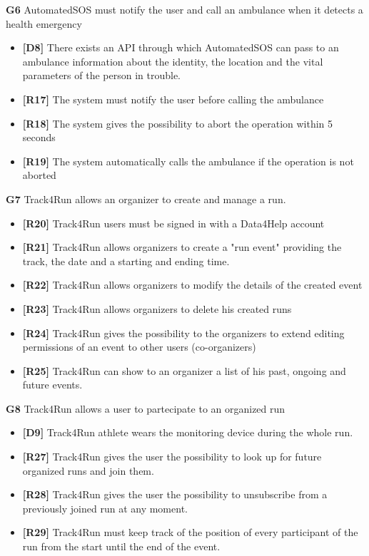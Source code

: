 \item \textbf{G6} AutomatedSOS must notify the user and call an ambulance when it detects a health emergency
\begin{itemize}
\item \textbf{[D8]} There exists an API through which AutomatedSOS can pass to an ambulance information about the identity, the location and the vital parameters of the person in trouble.
\item \textbf{[R17]} The system must notify the user before calling the ambulance
\item \textbf{[R18]} The system gives the possibility to abort the operation within 5 seconds
\item \textbf{[R19]} The system automatically calls the ambulance if the operation is not aborted
\end{itemize}

\item \textbf{G7} Track4Run allows an organizer to create and manage a run.
\begin{itemize}
\item \textbf{[R20]} Track4Run users must be signed in with a Data4Help account
\item \textbf{[R21]} Track4Run allows organizers to create a "run event" providing the track, the date and a starting and ending time.
\item \textbf{[R22]}  Track4Run allows organizers to modify the details of the created event
\item \textbf{[R23]} Track4Run allows organizers to delete his created runs
\item \textbf{[R24]} Track4Run gives the possibility to the organizers to extend editing permissions of an event to other users (co-organizers) 
\item \textbf{[R25]} Track4Run can show to an organizer a list of his past, ongoing and future events. 
\end{itemize}

\textbf{G8} Track4Run allows a user to partecipate to an organized run
\begin{itemize}
\item \textbf{[D9]} Track4Run athlete wears the monitoring device during the whole run.
\item \textbf{[R27]} Track4Run gives the user the possibility to look up for future organized runs and join them. 
\item \textbf{[R28]} Track4Run gives the user the possibility to unsubscribe from a previously joined run at any moment. 
\item \textbf{[R29]} Track4Run must keep track of the position of every participant of the run from the start until the end of the event. 
\end{itemize}

